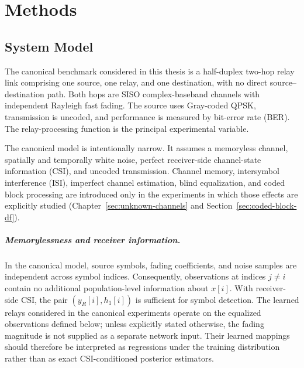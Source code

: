 \chapter{Methods}\label{sec:methods}

\section{System Model}\label{sec:system-model-1}

The canonical benchmark considered in this thesis is a half-duplex
two-hop relay link comprising one source, one relay, and one destination,
with no direct source--destination path. Both hops are SISO
complex-baseband channels with independent Rayleigh fast fading. The
source uses Gray-coded QPSK, transmission is uncoded, and performance is
measured by bit-error rate (BER). The relay-processing function is the
principal experimental variable.

The canonical model is intentionally narrow. It assumes a memoryless
channel, spatially and temporally white noise, perfect receiver-side
channel-state information (CSI), and uncoded transmission. Channel
memory, intersymbol interference (ISI), imperfect channel estimation,
blind equalization, and coded block processing are introduced only in
the experiments in which those effects are explicitly studied
(Chapter~\ref{sec:unknown-channels} and
Section~\ref{sec:coded-block-df}).

\paragraph{Memorylessness and receiver information.}
In the canonical model, source symbols, fading coefficients, and noise
samples are independent across symbol indices. Consequently,
observations at indices $j\neq i$ contain no additional
population-level information about $x[i]$. With receiver-side CSI, the
pair $(y_R[i],h_1[i])$ is sufficient for symbol detection. The learned
relays considered in the canonical experiments operate on the
equalized observations defined below; unless explicitly stated
otherwise, the fading magnitude is not supplied as a separate network
input. Their learned mappings should therefore be interpreted as
regressions under the training distribution rather than as exact
CSI-conditioned posterior estimators.

